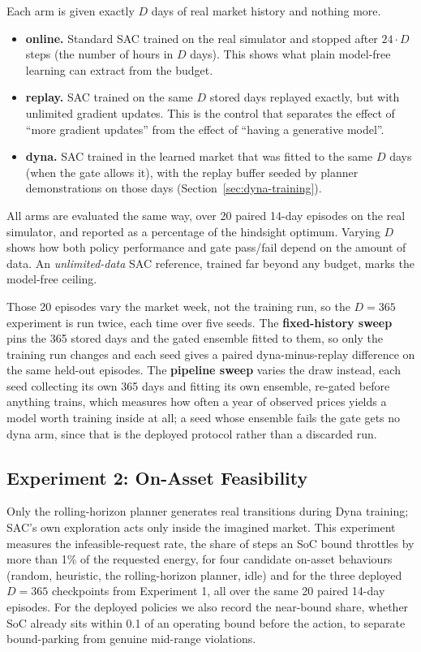 \documentclass[conference]{IEEEtran}
\begin{document}
Each arm is given exactly $D$ days of real market history and nothing more.

\begin{itemize}
\item \textbf{online.} Standard SAC trained on the real simulator and stopped after $24 \cdot D$ steps (the number of hours in $D$ days). This shows what plain model-free learning can extract from the budget.
\item \textbf{replay.} SAC trained on the same $D$ stored days replayed exactly, but with unlimited gradient updates. This is the control that separates the effect of ``more gradient updates'' from the effect of ``having a generative model''.
\item \textbf{dyna.} SAC trained in the learned market that was fitted to the same $D$ days (when the gate allows it), with the replay buffer seeded by planner demonstrations on those days (Section~\ref{sec:dyna-training}).
\end{itemize}

All arms are evaluated the same way, over 20 paired 14-day episodes on the real simulator, and reported as a percentage of the hindsight optimum. Varying $D$ shows how both policy performance and gate pass/fail depend on the amount of data. An \emph{unlimited-data} SAC reference, trained far beyond any budget, marks the model-free ceiling.

Those 20 episodes vary the market week, not the training run, so the $D=365$ experiment is run twice, each time over five seeds. The \textbf{fixed-history sweep} pins the 365 stored days and the gated ensemble fitted to them, so only the training run changes and each seed gives a paired dyna-minus-replay difference on the same held-out episodes. The \textbf{pipeline sweep} varies the draw instead, each seed collecting its own 365 days and fitting its own ensemble, re-gated before anything trains, which measures how often a year of observed prices yields a model worth training inside at all; a seed whose ensemble fails the gate gets no dyna arm, since that is the deployed protocol rather than a discarded run.

\subsection{Experiment 2: On-Asset Feasibility}
\label{sec:setup-safe}

Only the rolling-horizon planner generates real transitions during Dyna training; SAC's own exploration acts only inside the imagined market. This experiment measures the infeasible-request rate, the share of steps an SoC bound throttles by more than 1\% of the requested energy, for four candidate on-asset behaviours (random, heuristic, the rolling-horizon planner, idle) and for the three deployed $D{=}365$ checkpoints from Experiment 1, all over the same 20 paired 14-day episodes. For the deployed policies we also record the near-bound share, whether SoC already sits within 0.1 of an operating bound before the action, to separate bound-parking from genuine mid-range violations.
\end{document}
